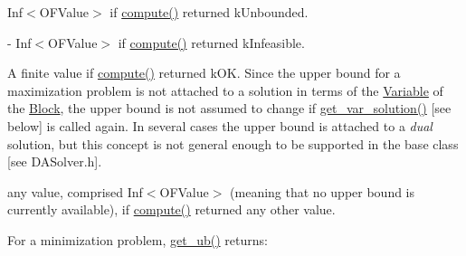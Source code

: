 \begin{DoxyItemize}
\item Inf$<$\+O\+F\+Value$>$ if \mbox{\hyperlink{class_s_m_spp__di__unipi__it_1_1_solver_a504d4e3e174c7a518cc66156a8a45ce5}{compute()}} returned k\+Unbounded.
\item -\/ Inf$<$\+O\+F\+Value$>$ if \mbox{\hyperlink{class_s_m_spp__di__unipi__it_1_1_solver_a504d4e3e174c7a518cc66156a8a45ce5}{compute()}} returned k\+Infeasible.
\item A finite value if \mbox{\hyperlink{class_s_m_spp__di__unipi__it_1_1_solver_a504d4e3e174c7a518cc66156a8a45ce5}{compute()}} returned k\+OK. Since the upper bound for a maximization problem is not attached to a solution in terms of the \mbox{\hyperlink{class_s_m_spp__di__unipi__it_1_1_variable}{Variable}} of the \mbox{\hyperlink{class_s_m_spp__di__unipi__it_1_1_block}{Block}}, the upper bound is not assumed to change if \mbox{\hyperlink{class_s_m_spp__di__unipi__it_1_1_solver_a91d7cd0dc4fa453406ef30db2bfa37a5}{get\+\_\+var\+\_\+solution()}} \mbox{[}see below\mbox{]} is called again. In several cases the upper bound is attached to a {\itshape dual} solution, but this concept is not general enough to be supported in the base class \mbox{[}see D\+A\+Solver.\+h\mbox{]}.
\item any value, comprised Inf$<$\+O\+F\+Value$>$ (meaning that no upper bound is currently available), if \mbox{\hyperlink{class_s_m_spp__di__unipi__it_1_1_solver_a504d4e3e174c7a518cc66156a8a45ce5}{compute()}} returned any other value.
\end{DoxyItemize}

For a minimization problem, \mbox{\hyperlink{class_s_m_spp__di__unipi__it_1_1_solver_a7304d819b2eeff3d4ba650055b24e3a5}{get\+\_\+ub()}} returns\+:



